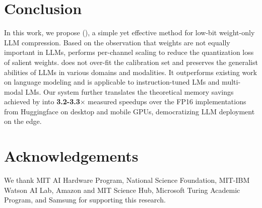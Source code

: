\section{Conclusion}
In this work, we propose \method (\methodshort), a simple yet effective method for low-bit weight-only LLM compression.
Based on the observation that weights are not equally important in LLMs, \methodshort performs per-channel scaling to reduce the quantization loss of salient weights. \methodshort does not over-fit the calibration set and preserves the generalist abilities of LLMs in various domains and modalities. It outperforms existing work on language modeling and is applicable to instruction-tuned LMs and multi-modal LMs. Our \system system further translates the
theoretical memory savings achieved by \methodshort into \textbf{3.2-3.3$\times$} measured speedups over the FP16 implementations from Huggingface on desktop and mobile GPUs, democratizing LLM deployment on the edge.

\section*{Acknowledgements}
We thank MIT AI Hardware Program, National Science Foundation, MIT-IBM Watson AI Lab, Amazon and MIT Science Hub, Microsoft Turing Academic Program, and Samsung for supporting this research.

